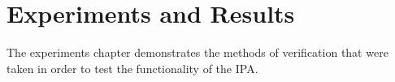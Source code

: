 \chapter{Experiments and Results}
\label{ch:experiments}

The experiments chapter demonstrates the methods of verification that were taken in order to test the functionality of the \ac{IPA}. 